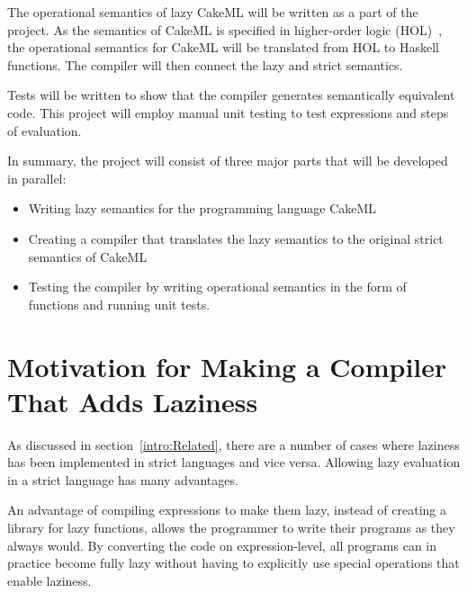 The operational semantics of lazy CakeML will be written as a part of the
project. As the semantics of CakeML is specified in higher-order logic
(HOL)~\cite{HOLInter57:online},
the operational semantics for CakeML will be translated from HOL to Haskell
functions. The compiler will then connect the lazy and strict semantics.

Tests will be written to show that the compiler generates semantically
equivalent code. This project will employ manual unit testing to test
expressions and steps of evaluation.

In summary, the project will consist of three major parts that will be developed
in parallel:
\begin{itemize}
 \item Writing lazy semantics for the programming language CakeML
 \item Creating a compiler that translates the lazy semantics to the original strict semantics of CakeML
 \item Testing the compiler by writing operational semantics in the form of functions and running unit tests.
\end{itemize}

\section{Motivation for Making a Compiler That Adds Laziness}
As discussed in section~\ref{intro:Related}, there are a number of cases where
laziness has been implemented in strict languages and vice versa. 
Allowing lazy evaluation in a strict language has many advantages.

An advantage of compiling expressions to make them lazy, instead of creating
a library for lazy functions, allows the programmer to write their programs as
they always would. By converting the code on expression-level, all programs can
in practice become fully lazy without having to explicitly use special
operations that enable laziness.
